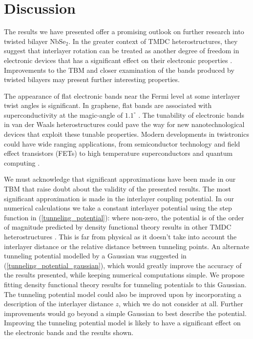 \documentclass[12pt]{report} %
\begin{document}
\section*{Discussion}
 The results we have presented offer a promising outlook on further research into twisted bilayer NbSe$_2$. In the greater context of TMDC heterostructures, they suggest that interlayer rotation can be treated as another degree of freedom in electronic devices that has a significant effect on their electronic properties \cite{Conte2019}. Improvements to the TBM and closer examination of the bands produced by twisted bilayers may present further interesting properties.

 The appearance of flat electronic bands near the Fermi level at some interlayer twist angles is significant. In graphene, flat bands are associated with superconductivity at the magic-angle of $1.1^\circ$ \cite{Cao2018, Bistritzer2011}. The tunability of electronic bands in van der Waals heterostructures could pave the way for new nanotechnological devices that exploit these tunable properties. Modern developments in twistronics could have wide ranging applications, from semiconductor technology and field effect transistors (FETs) to high temperature superconductors and quantum computing \cite{Ghuge2017, Geim2013, Gibney2019, Carr2017}. 

 We must acknowledge that significant approximations have been made in our TBM that raise doubt about the validity of the presented results. The most significant approximation is made in the interlayer coupling potential. In our numerical calculations we take a constant interlayer potential using the step function in (\ref{tunneling_potential}): where non-zero, the potential is of the order of magnitude predicted by density functional theory results in other TMDC heterostructures \cite{Conte2019}. This is far from physical as it doesn't take into account the interlayer distance or the relative distance between tunneling points. An alternate tunneling potential modelled by a Gaussian was suggested in (\ref{tunneling_potential_gaussian}), which would greatly improve the accuracy of the results presented, while keeping numerical computations simple. We propose fitting density functional theory results for tunneling potentials to this Gaussian. The tunneling potential model could also be improved upon by incorporating a description of the interlayer distance $z$, which we do not consider at all. Further improvements would go beyond a simple Gaussian to best describe the potential. Improving the tunneling potential model is likely to have a significant effect on the electronic bands and the results shown.
\end{document}
